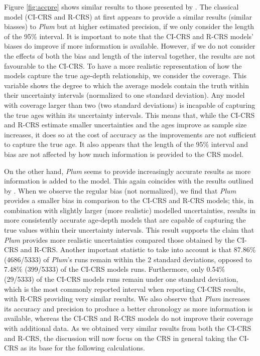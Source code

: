 \documentclass [10pt] {article}
\begin{document}
Figure \ref{fig:accpre} shows similar results to those presented by \citet{Blaauw2018}. 
The classical model (CI-CRS and R-CRS) at first appears to provide a similar results (similar biasses) to \textit{Plum} %
but at higher estimated precision, if we only consider the length of the 95\% interval. 
It is important to note that the CI-CRS and R-CRS models' biases do improve if more information is available.
However, if we do not consider the effects of both the bias and length of the interval together, the results are not favourable to the CI-CRS. 
To have a more realistic representation of how the models capture the true age-depth relationship, we consider the coverage. 
This variable shows the degree to which the average models contain the truth within their uncertainty intervals (normalized to one standard deviation). 
Any model with coverage larger than two (two standard deviations) is incapable of capturing the true ages within its uncertainty intervals.  
This means that, while the CI-CRS and R-CRS estimate smaller uncertainties and the ages improve as sample size increases, it does so at the cost of accuracy as the improvements are not sufficient to capture the true age.
It also appears that the length of the 95\% interval and bias are not affected by how much information is provided to the CRS model.

On the other hand, \textit{Plum} seems to provide increasingly accurate results as more information is added to the model.
This again coincides with the results outlined by \citet{Blaauw2018}. 
When we observe the regular bias (not normalized), we find that \textit{Plum} provides a smaller bias in comparison to the CI-CRS and R-CRS models; this, in combination with slightly larger (more realistic) modelled uncertainties, results in more consistently accurate age-depth models that are capable of capturing the true values within their uncertainty intervals. 
This result supports the claim that \textit{Plum} provides more realistic uncertainties compared those obtained by the CI-CRS and R-CRS. 
Another important statistic to take into account is that 87.86\% (4686/5333) of \textit{Plum}'s runs remain within the 2 standard deviations, opposed to 7.48\% (399/5333) of the CI-CRS models runs. 
Furthermore, only 0.54\% (29/5333) of the CI-CRS models runs remain under one standard deviation, which is the most commonly reported interval when reporting CI-CRS results, with R-CRS providing very similar results.
We also observe that \textit{Plum} increases its accuracy and precision to produce a better chronology as more information is available, whereas the CI-CRS and R-CRS models do not improve their coverage with additional data. 
As we obtained very similar results from both the CI-CRS and R-CRS, the discussion will now focus on the CRS in general taking the CI-CRS as its base for the following calculations.
\end{document}
